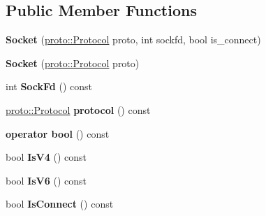 \subsection*{Public Member Functions}
\begin{DoxyCompactItemize}
\item 
\hypertarget{classlsf_1_1asio_1_1Socket_ad44f4f4da027beee6ee66d878d063675}{
{\bfseries Socket} (\hyperlink{classlsf_1_1asio_1_1proto_1_1Protocol}{proto::Protocol} proto, int sockfd, bool is\_\-connect)}
\label{classlsf_1_1asio_1_1Socket_ad44f4f4da027beee6ee66d878d063675}

\item 
\hypertarget{classlsf_1_1asio_1_1Socket_a29eb72f06406444b49db750c84ea2e23}{
{\bfseries Socket} (\hyperlink{classlsf_1_1asio_1_1proto_1_1Protocol}{proto::Protocol} proto)}
\label{classlsf_1_1asio_1_1Socket_a29eb72f06406444b49db750c84ea2e23}

\item 
\hypertarget{classlsf_1_1asio_1_1Socket_ae6ff3c2c49aa58b1fc155624ac2c4ee1}{
int {\bfseries SockFd} () const }
\label{classlsf_1_1asio_1_1Socket_ae6ff3c2c49aa58b1fc155624ac2c4ee1}

\item 
\hypertarget{classlsf_1_1asio_1_1Socket_a0ed4cc3acb0f675f5b3b21af8e00aba5}{
\hyperlink{classlsf_1_1asio_1_1proto_1_1Protocol}{proto::Protocol} {\bfseries protocol} () const }
\label{classlsf_1_1asio_1_1Socket_a0ed4cc3acb0f675f5b3b21af8e00aba5}

\item 
\hypertarget{classlsf_1_1asio_1_1Socket_afbd01aa3b2f93daf9ab1d868afa1b7e4}{
{\bfseries operator bool} () const }
\label{classlsf_1_1asio_1_1Socket_afbd01aa3b2f93daf9ab1d868afa1b7e4}

\item 
\hypertarget{classlsf_1_1asio_1_1Socket_a4e659c99dcf87a79227733aff20e31ff}{
bool {\bfseries IsV4} () const }
\label{classlsf_1_1asio_1_1Socket_a4e659c99dcf87a79227733aff20e31ff}

\item 
\hypertarget{classlsf_1_1asio_1_1Socket_a5a400d6a58fba55e157fb68b1d1f42ed}{
bool {\bfseries IsV6} () const }
\label{classlsf_1_1asio_1_1Socket_a5a400d6a58fba55e157fb68b1d1f42ed}

\item 
\hypertarget{classlsf_1_1asio_1_1Socket_a122f13d47d58603a6a9af363aafb5909}{
bool {\bfseries IsConnect} () const }
\label{classlsf_1_1asio_1_1Socket_a122f13d47d58603a6a9af363aafb5909}


\end{DoxyCompactItemize}
